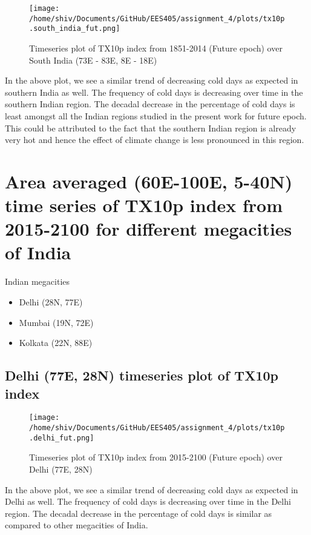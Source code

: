 \documentclass[a4paper, 12pt, twoside]{report}
\begin{document}
\begin{figure}[h]
    \centering
    \texttt{[image: /home/shiv/Documents/GitHub/EES405/assignment\_4/plots/tx10p.south\_india\_fut.png]}
    \caption{\centering Timeseries plot of TX10p index from 1851-2014 (Future epoch) over South India (73E - 83E, 8E - 18E)}
    \label{fig:TX10p_timeseries_south_india_fut}
\end{figure}

In the above plot, we see a similar trend of decreasing cold days as expected in southern India as well. The frequency of cold days is decreasing over time in the southern Indian region. The decadal decrease in the percentage of cold days is least amongst all the Indian regions studied in the present work for future epoch. This could be attributed to the fact that the southern Indian region is already very hot and hence the effect of climate change is less pronounced in this region.

\section{Area averaged (60E-100E, 5-40N) time series of TX10p index from 2015-2100 for different megacities of India}

Indian megacities
\begin{itemize}
    \item Delhi (28N, 77E)
    \item Mumbai (19N, 72E)
    \item Kolkata (22N, 88E)
\end{itemize}
\subsection{Delhi (77E, 28N) timeseries plot of TX10p index}

\begin{figure}[h]
    \centering
    \texttt{[image: /home/shiv/Documents/GitHub/EES405/assignment\_4/plots/tx10p.delhi\_fut.png]}
    \caption{\centering Timeseries plot of TX10p index from 2015-2100 (Future epoch) over Delhi (77E, 28N)}
    \label{fig:TX10p_timeseries_delhi_fut}
\end{figure}

In the above plot, we see a similar trend of decreasing cold days as expected in Delhi as well. The frequency of cold days is decreasing over time in the Delhi region. The decadal decrease in the percentage of cold days is similar as compared to other megacities of India.
\end{document}
